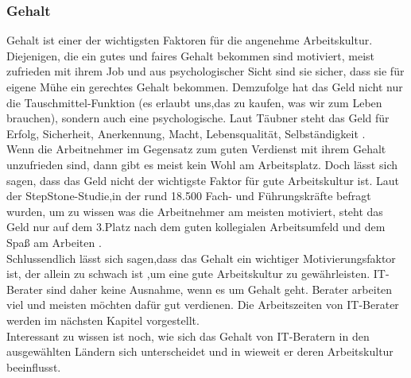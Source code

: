 \subsubsection{Gehalt}
Gehalt ist einer der wichtigsten Faktoren für die angenehme Arbeitskultur. Diejenigen, die ein gutes und faires Gehalt bekommen sind motiviert, meist zufrieden mit ihrem Job und aus psychologischer Sicht sind sie sicher, dass sie für eigene Mühe ein gerechtes Gehalt bekommen. Demzufolge hat das Geld nicht nur die Tauschmittel-Funktion (es erlaubt uns,das zu kaufen, was wir zum Leben brauchen), sondern auch eine psychologische. Laut Täubner steht das Geld für Erfolg, Sicherheit, Anerkennung, Macht, Lebensqualität, Selbständigkeit \cite{GehaltBedeutungDE}.\\
Wenn die Arbeitnehmer im Gegensatz zum guten Verdienst mit ihrem Gehalt unzufrieden sind, dann gibt es meist kein Wohl am Arbeitsplatz. Doch lässt sich sagen, dass das Geld nicht der wichtigste Faktor für gute Arbeitskultur ist. Laut der StepStone-Studie,in der rund 18.500 Fach- und Führungskräfte befragt wurden, um zu wissen was die Arbeitnehmer am meisten motiviert, steht das Geld nur auf dem 3.Platz nach dem guten kollegialen Arbeitsumfeld und dem Spaß am Arbeiten \cite{GehaltNR.3DE}.\\
 Schlussendlich lässt sich sagen,dass das Gehalt ein wichtiger Motivierungsfaktor ist, der allein zu schwach ist ,um eine gute Arbeitskultur zu gewährleisten.
IT-Berater sind daher keine Ausnahme, wenn es um Gehalt geht. Berater arbeiten viel und meisten möchten dafür gut verdienen. Die Arbeitszeiten von IT-Berater werden im nächsten Kapitel vorgestellt.\\
Interessant zu wissen ist noch, wie sich das Gehalt von IT-Beratern in den ausgewählten Ländern sich unterscheidet und in wieweit er deren Arbeitskultur beeinflusst.
